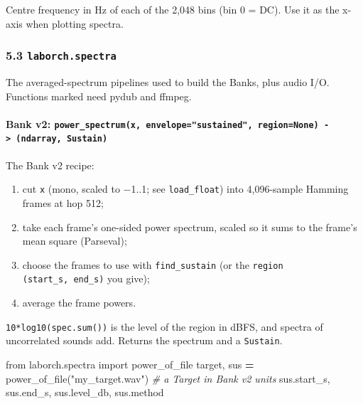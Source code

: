 \documentclass[
  10pt,
]{article}
\newenvironment{Shaded}{\begin{snugshade}}{\end{snugshade}}
\newcommand{\CommentTok}[1]{\textcolor[rgb]{0.56,0.35,0.01}{\textit{#1}}}
\newcommand{\ImportTok}[1]{#1}
\newcommand{\NormalTok}[1]{#1}
\newcommand{\OperatorTok}[1]{\textcolor[rgb]{0.81,0.36,0.00}{\textbf{#1}}}
\newcommand{\StringTok}[1]{\textcolor[rgb]{0.31,0.60,0.02}{#1}}
\providecommand{\tightlist}{%
  \setlength{\itemsep}{0pt}\setlength{\parskip}{0pt}}
\begin{document}
Centre frequency in Hz of each of the 2,048 bins (bin 0 =
DC). Use it as the x-axis when plotting spectra.

\subsubsection{\texorpdfstring{5.3
\texttt{laborch.spectra}}{5.3 laborch.spectra}}

The averaged-spectrum pipelines used to build the Banks,
plus audio I/O. Functions marked \textdagger{} need pydub and ffmpeg.

\paragraph{\texorpdfstring{Bank v2:
\texttt{power\_spectrum(x,\ envelope="sustained",\ region=None)\ -\textgreater{}\ (ndarray,\ Sustain)}}{Bank v2: power\_spectrum(x, envelope="sustained", region=None) -\textgreater{} (ndarray, Sustain)}}

The Bank v2 recipe:

\begin{enumerate}
\def\labelenumi{\arabic{enumi}.}
\tightlist
\item
  cut \texttt{x} (mono, scaled to −1..1; see
  \texttt{load\_float}) into 4,096-sample Hamming frames at
  hop 512;
\item
  take each frame's one-sided power spectrum, scaled so it
  sums to the frame's mean square (Parseval);
\item
  choose the frames to use with \texttt{find\_sustain} (or
  the \texttt{region} \texttt{(start\_s,\ end\_s)} you
  give);
\item
  average the frame powers.
\end{enumerate}

\texttt{10*log10(spec.sum())} is the level of the region in
dBFS, and spectra of uncorrelated sounds add. Returns the
spectrum and a \texttt{Sustain}.

\begin{Shaded}
\begin{Highlighting}[]
\ImportTok{from}\NormalTok{ laborch.spectra }\ImportTok{import}\NormalTok{ power\_of\_file}
\NormalTok{target, sus }\OperatorTok{=}\NormalTok{ power\_of\_file(}\StringTok{"my\_target.wav"}\NormalTok{)      }\CommentTok{\# a Target in Bank v2 units}
\NormalTok{sus.start\_s, sus.end\_s, sus.level\_db, sus.method}
\end{Highlighting}
\end{Shaded}
\end{document}
